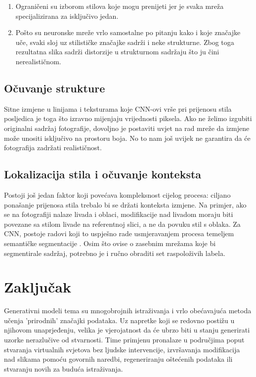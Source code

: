 \documentclass[lmodern, utf8, seminar]{fer}
\begin{document}
\begin{enumerate} 
\item Ograničeni su izborom stilova koje mogu prenijeti jer je svaka mreža specijalizirana za isključivo jedan.
\item Pošto su neuronske mreže vrlo samostalne po pitanju kako i koje značajke uče, svaki sloj uz stilističke značajke sadrži i neke strukturne. Zbog toga rezultatna slika sadrži distorzije u strukturnom sadržaju što ju čini nerealističnom.
\end{enumerate}

\section{Očuvanje strukture}
Sitne izmjene u linijama i teksturama koje CNN-ovi vrše pri prijenosu stila posljedica je toga što izravno mijenjaju vrijednosti piksela. Ako ne želimo izgubiti originalni sadržaj fotografije, dovoljno je postaviti uvjet na rad mreže da izmjene može unositi isključivo na prostoru boja. No to nam još uvijek ne garantira da će fotografija zadržati realističnost.

\section{Lokalizacija stila i očuvanje konteksta} \cite{luan2017deep}
Postoji još jedan faktor koji povećava kompleksnost cijelog procesa: ciljano ponašanje prijenosa stila trebalo bi se držati konteksta izmjene. Na primjer, ako se na fotografiji nalaze livada i oblaci, modifikacije nad livadom moraju biti povezane sa stilom livade na referentnoj slici, a ne da povuku stil s oblaka. 
Za CNN, postoje radovi koji to uspješno rade usmjeravanjem procesa temeljem semantičke segmentacije \cite{luan2017deep}. Osim što ovise o zasebnim mrežama koje bi segmentirale sadržaj, potrebno je i ručno obraditi set raspoloživih labela.



\chapter{Zaključak}
Generativni modeli tema su mnogobrojnih istraživanja i vrlo obećavajuća metoda učenja 'prirodnih' značajki podataka. Uz napretke koji se redovno postižu u njihovom unaprjeđenju, velika je vjerojatnost da će ubrzo biti u stanju generirati uzorke nerazlučive od stvarnosti. Time primjenu pronalaze u područjima poput stvaranja virtualnih svjetova bez ljudske intervencije, izvršavanja modifikacija nad slikama pomoću govornih naredbi, regeneriranju oštećenih podataka ili stvaranju novih za buduća istraživanja.
\newline
\end{document}
